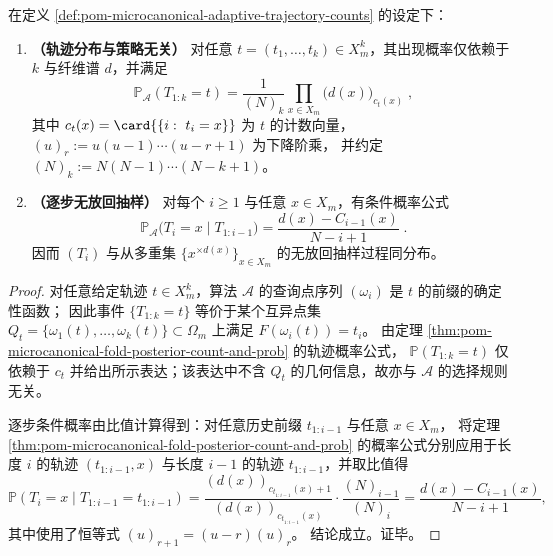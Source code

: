 \begin{theorem}\label{thm:pom-microcanonical-adaptive-no-gain-without-replacement}
在定义 \ref{def:pom-microcanonical-adaptive-trajectory-counts} 的设定下：
\begin{enumerate}
  \item \textbf{（轨迹分布与策略无关）}
  对任意 \(t=(t_1,\dots,t_k)\in X_m^k\)，其出现概率仅依赖于 \(k\) 与纤维谱 \(d\)，并满足
  \[
  \boxed{\;
  \mathbb{P}_{\mathcal{A}}(T_{1:k}=t)
  =\frac{1}{(N)_k}\prod_{x\in X_m}\bigl(d(x)\bigr)_{c_t(x)}\;},
  \]
  其中 \(c_t(x)=\card{\{i:\ t_i=x\}}\) 为 \(t\) 的计数向量，\((u)_r:=u(u-1)\cdots(u-r+1)\) 为下降阶乘，
  并约定 \((N)_k:=N(N-1)\cdots(N-k+1)\)。
  \item \textbf{（逐步无放回抽样）}
  对每个 \(i\ge 1\) 与任意 \(x\in X_m\)，有条件概率公式
  \[
  \boxed{\;
  \mathbb{P}_{\mathcal{A}}\!\bigl(T_i=x\mid T_{1:i-1}\bigr)
  =\frac{d(x)-C_{i-1}(x)}{N-i+1}\; } .
  \]
  因而 \((T_i)\) 与从多重集 \(\{x^{\times d(x)}\}_{x\in X_m}\) 的无放回抽样过程同分布。
\end{enumerate}
\end{theorem}
\begin{proof}
对任意给定轨迹 \(t\in X_m^k\)，算法 \(\mathcal{A}\) 的查询点序列 \((\omega_i)\) 是 \(t\) 的前缀的确定性函数；
因此事件 \(\{T_{1:k}=t\}\) 等价于某个互异点集 \(Q_t=\{\omega_1(t),\dots,\omega_k(t)\}\subset\Omega_m\) 上满足
\(
F(\omega_i(t))=t_i
\)。
由定理 \ref{thm:pom-microcanonical-fold-posterior-count-and-prob} 的轨迹概率公式，
\(\mathbb{P}(T_{1:k}=t)\) 仅依赖于 \(c_t\) 并给出所示表达；该表达中不含 \(Q_t\) 的几何信息，故亦与 \(\mathcal{A}\) 的选择规则无关。
\par
逐步条件概率由比值计算得到：对任意历史前缀 \(t_{1:i-1}\) 与任意 \(x\in X_m\)，
将定理 \ref{thm:pom-microcanonical-fold-posterior-count-and-prob} 的概率公式分别应用于长度 \(i\) 的轨迹 \((t_{1:i-1},x)\) 与长度 \(i-1\) 的轨迹 \(t_{1:i-1}\)，并取比值得
\[
\mathbb{P}(T_i=x\mid T_{1:i-1}=t_{1:i-1})
=\frac{(d(x))_{c_{t_{1:i-1}}(x)+1}}{(d(x))_{c_{t_{1:i-1}}(x)}}\cdot\frac{(N)_{i-1}}{(N)_{i}}
=\frac{d(x)-C_{i-1}(x)}{N-i+1},
\]
其中使用了恒等式 \((u)_{r+1}=(u-r)(u)_r\)。
结论成立。证毕。
\end{proof}


